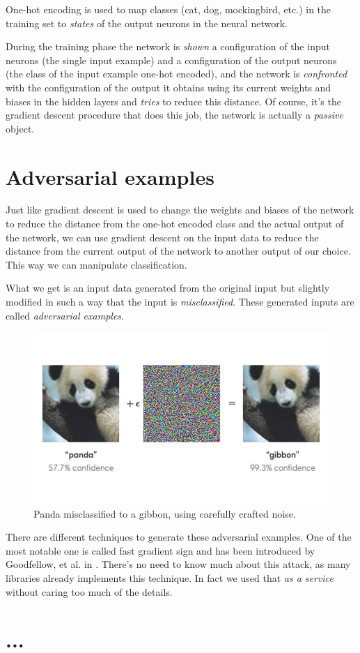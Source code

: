 One-hot encoding is used to map classes (cat, dog, mockingbird, etc.)
in the training set to \emph{states} of the output neurons in the
neural network.

During the training phase the network is \emph{shown} a
configuration of the input neurons (the single input example) and a
configuration of the output neurons (the class of the input example
one-hot encoded), and the network is \emph{confronted} with the
configuration of the output it obtains using its current weights and biases
in the hidden layers and \emph{tries} to reduce this distance. Of
course, it's the gradient descent procedure that does this job, the
network is actually a \emph{passive} object.

\section{Adversarial examples}

Just like gradient descent is used to change the weights and biases of
the network to reduce the distance from the one-hot encoded class and
the actual output of the network, we can use gradient descent on the
input data to reduce the distance from the current output of the network to
another output of our choice. This way we can manipulate classification.

What we get is an input data generated from the original input but
slightly modified in such a way that the input is \emph{misclassified}.
These generated inputs are called \emph{adversarial examples}.

\begin{figure}
  \centering
  \includegraphics[width=\linewidth]{panda-gibbon.jpg}
  \caption{Panda misclassified to a gibbon, using carefully crafted
    noise.}
\end{figure}

There are different techniques to generate these adversarial examples.
One of the most notable one is called fast gradient sign and has been
introduced by Goodfellow, et al. in \cite{goodfellow6572explaining}.
There's no need to know much about this attack, as many libraries
already implements this technique. In fact we used that \emph{as a service}
without caring too much of the details.

\section{...}

